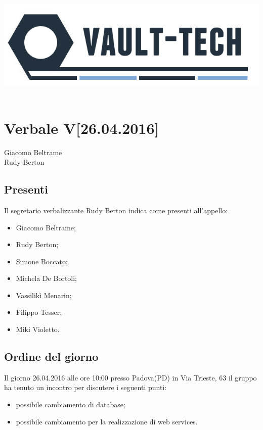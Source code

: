 \documentclass[a4paper]{article}
\def\DATA{26.04.2016}
\def\ORA{10:00}
\def\CITTA{Padova}
\def\PROVINCIA{PD}
\def\VIA{Via Trieste, 63}
\def\SEGRETARIO{Rudy Berton}
\def\RESPONSABILE{Giacomo Beltrame}
\begin{document}
\begin{center}
\includegraphics[scale=0.5]{Img/logo.png}\\
\vspace{1cm}
{\Huge \PROGETTO}\\
\vspace{1cm}
\section*{Verbale V[\DATA]}
\end{center}

%
%
 \RESPONSABILE
\\  \SEGRETARIO
\\
\subsection*{Presenti}
Il segretario verbalizzante \SEGRETARIO{} indica come presenti all'appello:
\begin{itemize}
\item Giacomo Beltrame;
\item Rudy Berton;
\item Simone Boccato;
\item Michela De Bortoli;
\item Vassilikì Menarin;
\item Filippo Tesser;
\item Miki Violetto.
\end{itemize}

\subsection*{Ordine del giorno}
Il giorno \DATA{} alle ore \ORA{} presso \CITTA (\PROVINCIA) in \VIA{} il gruppo \AUTORE{} ha tenuto un incontro per discutere i seguenti punti:
\begin{itemize}
\item possibile cambiamento di database;
\item possibile cambiamento per la realizzazione di web services.

\end{itemize}
\end{document}
